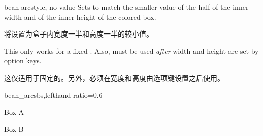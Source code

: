   
  \begin{docTcbKey}[][doc new=2015-05-05]{bean arc}{}{style, no value}
  Sets  to match the smaller value of the
  half of the inner width and of the inner height of the colored box.
  
  
  将设置为盒子内宽度一半和高度一半的较小值。

  \begin{marker}
  This only works for a fixed . Also, 
  must be used \emph{after} width and height are set by option keys.
  
  这仅适用于固定的。另外，必须在宽度和高度由选项键设置之后使用。
  \end{marker}
  \begin{exdispExample*}{bean_arc}{sbs,lefthand ratio=0.6}
  
  \begin{tcolorbox}[width=3cm,height=2cm,
  bean arc]
  Box A
  \end{tcolorbox}
  
  \begin{tcolorbox}[width=2cm,height=3cm,
  bean arc]
  Box B
  \end{tcolorbox}
  \end{exdispExample*}
  \end{docTcbKey}
  
